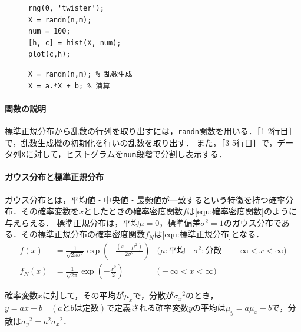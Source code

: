 \begin{figure}
    \vspace{-.5cm}
    \begin{lstlisting}[caption={乱数生成・ヒストグラム},label={src:乱数生成・ヒストグラム},xleftmargin=3mm]
rng(0, 'twister');
X = randn(n,m);
num = 100;
[h, c] = hist(X, num);
plot(c,h);
    \end{lstlisting}
    \begin{lstlisting}[caption={平均と標準偏差の変更},label={src:平均と標準偏差の変更},numbers={none},xleftmargin=3mm]
X = randn(n,m); % 乱数生成
X = a.*X + b; % 演算
    \end{lstlisting}
    \vspace{-1cm}
\end{figure}
\method
\paragraph{\matlab 関数の説明}標準正規分布から乱数の行列を取り出すには，\texttt{randn}関数を用いる．［1-2行目］で，乱数生成機の初期化を行いの乱数を取り出す．
また，［3-5行目］で，データ列\texttt{X}に対して，ヒストグラムを\texttt{num}段階で分割し表示する．
\paragraph{ガウス分布と標準正規分布}ガウス分布とは，平均値・中央値・最頻値が一致するという特徴を持つ確率分布．その確率変数を\(x\)としたときの確率密度関数\(f\)は\eqref{equ:確率密度関数}のように与えらえる．
標準正規分布は，平均\(\mu=0\)，標準偏差\(\sigma^2=1\)のガウス分布である．その標準正規分布の確率密度関数\(f_N\)は\eqref{equ:標準正規分布}となる．
\begin{align}
    f(x)   & = \frac{1}{\sqrt{2\pi\sigma^2}}\exp\left(-\frac{(x-\mu^2)}{2\sigma^2}\right) & \big(\mu:\textrm{平均}\quad\sigma^2:\textrm{分散}\quad-\infty<x<\infty\big)\label{equ:確率密度関数} \\
    f_N(x) & =\frac{1}{\sqrt{2\pi}}\exp\left(-\frac{x^2}{2}\right)                        & \big(-\infty<x<\infty\big)\label{equ:標準正規分布}
\end{align}
\begin{leftbar}
    確率変数\(x\)に対して，その平均が\(\mu_x\)で，分散が\({\sigma_x}^2\)のとき，\(y=ax+b\quad(a\textrm{と}b\textrm{は定数})\)で定義される確率変数\(y\)の平均は\(\mu_y=a\mu_x+b\)で，分散は\({\sigma_y}^2=a^2{\sigma_x}^2\)．\hfill\cite{matlab_randn}
\end{leftbar}

